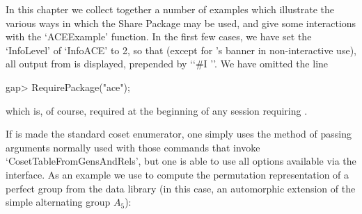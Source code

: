 
In this chapter  we  collect  together  a  number  of  examples  which
illustrate the various ways in which the {\ACE} Share Package  may  be
used, and give some interactions with the  `ACEExample'  function.  In
the first few cases, we have set the `InfoLevel' of `InfoACE' to 2, so
that (except for {\ACE}'s banner in non-interactive use),  all  output
from {\ACE} is displayed, prepended by \lq{}`\#I ''. We  have  omitted
the line

\beginexample
gap> RequirePackage("ace");
\endexample

which is,  of  course,  required  at  the  beginning  of  any  session
requiring {\ACE}.


If {\ACE} is made the standard coset enumerator, one simply  uses  the
method of passing arguments normally used  with  those  commands  that
invoke `CosetTableFromGensAndRels', but one is able to use all options
available via the {\ACE} interface. As an example  we  use  {\ACE}  to
compute the permutation representation of a  perfect  group  from  the
data library (in this case, an automorphic  extension  of  the  simple
alternating group $A_5$):

